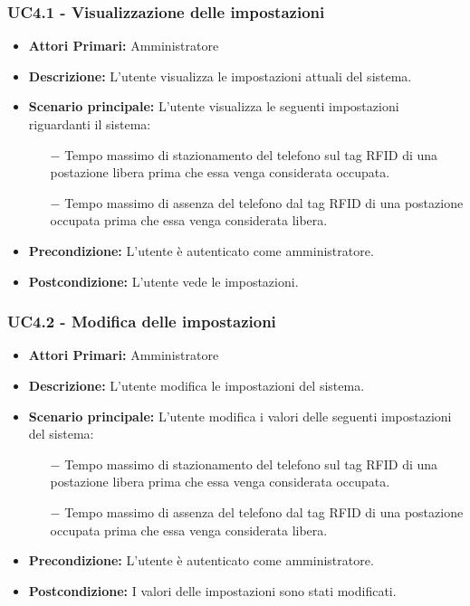 \subsubsection{ UC4.1 - Visualizzazione delle impostazioni}
\begin{itemize}
	\item\textbf{Attori Primari:} 
	Amministratore
	\item\textbf{Descrizione:} 
	L'utente visualizza le impostazioni attuali del sistema.
	\item\textbf{Scenario principale:} 
	L'utente visualizza le seguenti impostazioni riguardanti il sistema:
	\begin{itemize}
		\item[$-$] Tempo massimo di stazionamento del telefono sul tag RFID di una postazione libera prima che essa venga considerata occupata.
		\item[$-$] Tempo massimo di assenza del telefono dal tag RFID di una postazione occupata prima che essa venga considerata libera.
	\end{itemize}
	\item\textbf{Precondizione:} 
	L'utente è autenticato come amministratore.
	\item\textbf{Postcondizione:}
	L'utente vede le impostazioni.
\end{itemize}

\subsubsection{ UC4.2 - Modifica delle impostazioni}
\begin{itemize}
	\item\textbf{Attori Primari:} 
	Amministratore
	\item\textbf{Descrizione:} 
	L'utente modifica le impostazioni del sistema.
	\item\textbf{Scenario principale:} 
	L'utente modifica i valori delle seguenti impostazioni del sistema:
	\begin{itemize}
		\item[$-$] Tempo massimo di stazionamento del telefono sul tag RFID di una postazione libera prima che essa venga considerata occupata.
		\item[$-$] Tempo massimo di assenza del telefono dal tag RFID di una postazione occupata prima che essa venga considerata libera.
	\end{itemize}
	\item\textbf{Precondizione:} 
	L'utente è autenticato come amministratore.
	\item\textbf{Postcondizione:}
	I valori delle impostazioni sono stati modificati.
\end{itemize}

